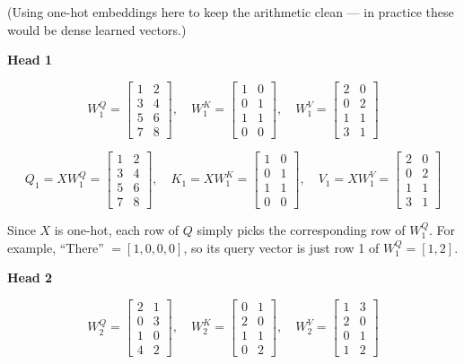 (Using one-hot embeddings here to keep the arithmetic clean --- in practice these would be dense learned vectors.)

\textbf{Head 1}

\[
W^Q_1 = \begin{bmatrix}1&2\\3&4\\5&6\\7&8\end{bmatrix}, \quad
W^K_1 = \begin{bmatrix}1&0\\0&1\\1&1\\0&0\end{bmatrix}, \quad
W^V_1 = \begin{bmatrix}2&0\\0&2\\1&1\\3&1\end{bmatrix}
\]

\[
Q_1 = XW^Q_1 = \begin{bmatrix}1&2\\3&4\\5&6\\7&8\end{bmatrix}, \quad
K_1 = XW^K_1 = \begin{bmatrix}1&0\\0&1\\1&1\\0&0\end{bmatrix}, \quad
V_1 = XW^V_1 = \begin{bmatrix}2&0\\0&2\\1&1\\3&1\end{bmatrix}
\]

Since $X$ is one-hot, each row of $Q$ simply picks the corresponding row of $W^Q_1$. For example, ``There'' $= [1,0,0,0]$, so its query vector is just row 1 of $W^Q_1 = [1, 2]$.

\textbf{Head 2}

\[
W^Q_2 = \begin{bmatrix}2&1\\0&3\\1&0\\4&2\end{bmatrix}, \quad
W^K_2 = \begin{bmatrix}0&1\\2&0\\1&1\\0&2\end{bmatrix}, \quad
W^V_2 = \begin{bmatrix}1&3\\2&0\\0&1\\1&2\end{bmatrix}
\]

